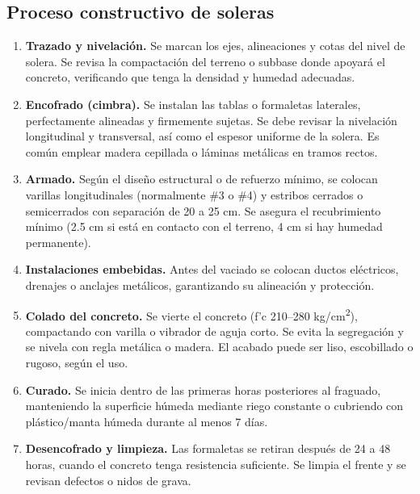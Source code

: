 \documentclass[12pt]{article}
\begin{document}
	\subsection{Proceso constructivo de soleras}
	
	\begin{enumerate}[label=\textbf{\arabic*.},leftmargin=1.2cm]
		\item \textbf{Trazado y nivelación.}  
		Se marcan los ejes, alineaciones y cotas del nivel de solera. Se revisa la compactación del terreno o subbase donde apoyará el concreto, verificando que tenga la densidad y humedad adecuadas.
		
		\item \textbf{Encofrado (cimbra).}  
		Se instalan las tablas o formaletas laterales, perfectamente alineadas y firmemente sujetas. Se debe revisar la nivelación longitudinal y transversal, así como el espesor uniforme de la solera. Es común emplear madera cepillada o láminas metálicas en tramos rectos.
		
		\item \textbf{Armado.}  
		Según el diseño estructural o de refuerzo mínimo, se colocan varillas longitudinales (normalmente \#3 o \#4) y estribos cerrados o semicerrados con separación de 20 a 25 cm. Se asegura el recubrimiento mínimo (2.5 cm si está en contacto con el terreno, 4 cm si hay humedad permanente).
		
		\item \textbf{Instalaciones embebidas.}  
		Antes del vaciado se colocan ductos eléctricos, drenajes o anclajes metálicos, garantizando su alineación y protección.
		
		\item \textbf{Colado del concreto.}  
		Se vierte el concreto (f’c 210–280 kg/cm\textsuperscript{2}), compactando con varilla o vibrador de aguja corto. Se evita la segregación y se nivela con regla metálica o madera. El acabado puede ser liso, escobillado o rugoso, según el uso.
		
		\item \textbf{Curado.}  
		Se inicia dentro de las primeras horas posteriores al fraguado, manteniendo la superficie húmeda mediante riego constante o cubriendo con plástico/manta húmeda durante al menos 7 días.
		
		\item \textbf{Desencofrado y limpieza.}  
		Las formaletas se retiran después de 24 a 48 horas, cuando el concreto tenga resistencia suficiente. Se limpia el frente y se revisan defectos o nidos de grava.
	\end{enumerate}
	
\end{document}
